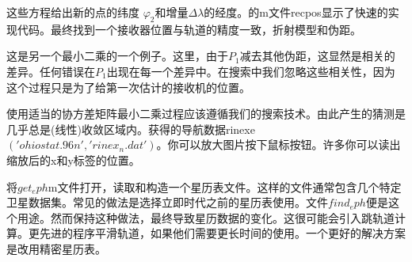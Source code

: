 	这些方程给出新的点的纬度 $\varphi_2$和增量$\Delta\lambda$的经度。的m文件recpos显示了快速的实现代码。最终找到一个接收器位置与轨道的精度一致，折射模型和伪距。
		
	这是另一个最小二乘的一个例子。这里，由于$P_1$减去其他伪距，这显然是相关的差异。任何错误在$P_1$出现在每一个差异中。在搜索中我们忽略这些相关性，因为这个过程只是为了给第一次估计的接收机的位置。
		
	使用适当的协方差矩阵最小二乘过程应该遵循我们的搜索技术。由此产生的猜测是几乎总是(线性)收敛区域内。获得的导航数据rinexe $('ohiostat.96n','rinex_n.dat')$。你可以放大图片按下鼠标按钮。许多你可以读出缩放后的x和y标签的位置。

	将$get_eph$m文件打开，读取和构造一个星历表文件。这样的文件通常包含几个特定卫星数据集。常见的做法是选择立即时代之前的星历表使用。文件$find_eph$便是这个用途。然而保持这种做法，最终导致星历数据的变化。这很可能会引入跳轨道计算。更先进的程序平滑轨道，如果他们需要更长时间的使用。一个更好的解决方案是改用精密星历表。
